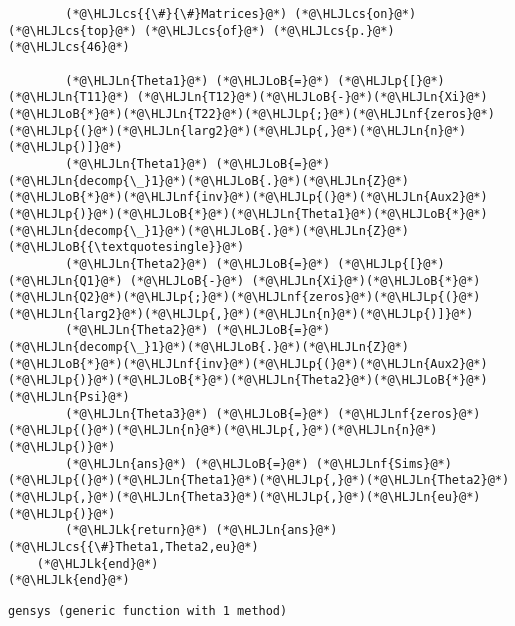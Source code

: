\documentclass[12pt,a4paper]{article}
\newcommand{\HLJLk}[1]{\textcolor[RGB]{148,91,176}{\textbf{#1}}}
\newcommand{\HLJLn}[1]{#1}
\newcommand{\HLJLnf}[1]{\textcolor[RGB]{66,102,213}{#1}}
\newcommand{\HLJLoB}[1]{\textcolor[RGB]{102,102,102}{\textbf{#1}}}
\newcommand{\HLJLp}[1]{#1}
\newcommand{\HLJLcs}[1]{\textcolor[RGB]{153,153,119}{\textit{#1}}}
\begin{document}
\begin{lstlisting}
        (*@\HLJLcs{{\#}{\#}Matrices}@*) (*@\HLJLcs{on}@*) (*@\HLJLcs{top}@*) (*@\HLJLcs{of}@*) (*@\HLJLcs{p.}@*) (*@\HLJLcs{46}@*)

        (*@\HLJLn{Theta1}@*) (*@\HLJLoB{=}@*) (*@\HLJLp{[}@*)(*@\HLJLn{T11}@*) (*@\HLJLn{T12}@*)(*@\HLJLoB{-}@*)(*@\HLJLn{Xi}@*)(*@\HLJLoB{*}@*)(*@\HLJLn{T22}@*)(*@\HLJLp{;}@*)(*@\HLJLnf{zeros}@*)(*@\HLJLp{(}@*)(*@\HLJLn{larg2}@*)(*@\HLJLp{,}@*)(*@\HLJLn{n}@*)(*@\HLJLp{)]}@*)
        (*@\HLJLn{Theta1}@*) (*@\HLJLoB{=}@*) (*@\HLJLn{decomp{\_}1}@*)(*@\HLJLoB{.}@*)(*@\HLJLn{Z}@*)(*@\HLJLoB{*}@*)(*@\HLJLnf{inv}@*)(*@\HLJLp{(}@*)(*@\HLJLn{Aux2}@*)(*@\HLJLp{)}@*)(*@\HLJLoB{*}@*)(*@\HLJLn{Theta1}@*)(*@\HLJLoB{*}@*)(*@\HLJLn{decomp{\_}1}@*)(*@\HLJLoB{.}@*)(*@\HLJLn{Z}@*)(*@\HLJLoB{{\textquotesingle}}@*)
        (*@\HLJLn{Theta2}@*) (*@\HLJLoB{=}@*) (*@\HLJLp{[}@*)(*@\HLJLn{Q1}@*) (*@\HLJLoB{-}@*) (*@\HLJLn{Xi}@*)(*@\HLJLoB{*}@*)(*@\HLJLn{Q2}@*)(*@\HLJLp{;}@*)(*@\HLJLnf{zeros}@*)(*@\HLJLp{(}@*)(*@\HLJLn{larg2}@*)(*@\HLJLp{,}@*)(*@\HLJLn{n}@*)(*@\HLJLp{)]}@*)
        (*@\HLJLn{Theta2}@*) (*@\HLJLoB{=}@*) (*@\HLJLn{decomp{\_}1}@*)(*@\HLJLoB{.}@*)(*@\HLJLn{Z}@*)(*@\HLJLoB{*}@*)(*@\HLJLnf{inv}@*)(*@\HLJLp{(}@*)(*@\HLJLn{Aux2}@*)(*@\HLJLp{)}@*)(*@\HLJLoB{*}@*)(*@\HLJLn{Theta2}@*)(*@\HLJLoB{*}@*)(*@\HLJLn{Psi}@*)
        (*@\HLJLn{Theta3}@*) (*@\HLJLoB{=}@*) (*@\HLJLnf{zeros}@*)(*@\HLJLp{(}@*)(*@\HLJLn{n}@*)(*@\HLJLp{,}@*)(*@\HLJLn{n}@*)(*@\HLJLp{)}@*)
        (*@\HLJLn{ans}@*) (*@\HLJLoB{=}@*) (*@\HLJLnf{Sims}@*)(*@\HLJLp{(}@*)(*@\HLJLn{Theta1}@*)(*@\HLJLp{,}@*)(*@\HLJLn{Theta2}@*)(*@\HLJLp{,}@*)(*@\HLJLn{Theta3}@*)(*@\HLJLp{,}@*)(*@\HLJLn{eu}@*)(*@\HLJLp{)}@*)
        (*@\HLJLk{return}@*) (*@\HLJLn{ans}@*)(*@\HLJLcs{{\#}Theta1,Theta2,eu}@*)
    (*@\HLJLk{end}@*)
(*@\HLJLk{end}@*)
\end{lstlisting}

\begin{lstlisting}
gensys (generic function with 1 method)
\end{lstlisting}
\end{document}
